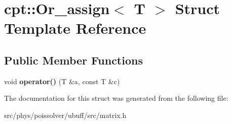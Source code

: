 \hypertarget{structcpt_1_1Or__assign}{}\section{cpt\+:\+:Or\+\_\+assign$<$ T $>$ Struct Template Reference}
\label{structcpt_1_1Or__assign}
\subsection*{Public Member Functions}
\begin{DoxyCompactItemize}
\item 
void {\bfseries operator()} (T \&a, const T \&c)\hypertarget{structcpt_1_1Or__assign_aac64e539aa49fe6229c161157bc824b5}{}\label{structcpt_1_1Or__assign_aac64e539aa49fe6229c161157bc824b5}

\end{DoxyCompactItemize}


The documentation for this struct was generated from the following file\+:\begin{DoxyCompactItemize}
\item 
src/phys/poissolver/ubuff/src/matrix.\+h\end{DoxyCompactItemize}
